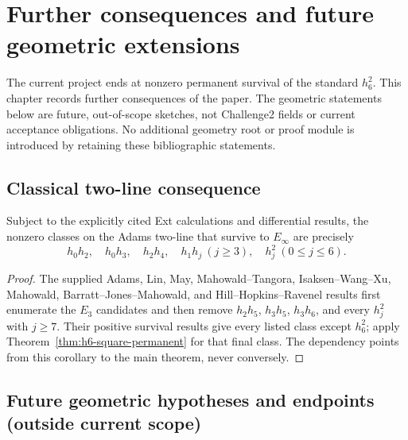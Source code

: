 \chapter{Further consequences and future geometric extensions}
\label{chap:final-kervaire}

The current project ends at nonzero permanent survival of the standard
$h_6^2$. This chapter records further consequences of the paper. The geometric
statements below are future, out-of-scope sketches, not Challenge2 fields or
current acceptance obligations. No additional geometry root or proof module is
introduced by retaining these bibliographic statements.

\section{Classical two-line consequence}

\begin{corollary}
  \label{cor:adams-two-line-survivors}
  \notready
  Subject to the explicitly cited Ext calculations and differential results,
  the nonzero classes on the Adams two-line that survive to $E_\infty$ are
  precisely
  \[
    h_0h_2,\quad h_0h_3,\quad h_2h_4,\quad
    h_1h_j\ (j\ge3),\quad h_j^2\ (0\le j\le6).
  \]
\end{corollary}

\begin{proof}
  The supplied Adams, Lin, May, Mahowald--Tangora, Isaksen--Wang--Xu,
  Mahowald, Barratt--Jones--Mahowald, and Hill--Hopkins--Ravenel results first
  enumerate the $E_3$ candidates and then remove $h_2h_5$, $h_3h_5$,
  $h_3h_6$, and every $h_j^2$ with $j\ge7$.  Their positive survival results
  give every listed class except $h_6^2$; apply
  Theorem~\ref{thm:h6-square-permanent} for that final class.  The dependency
  points from this corollary to the main theorem, never conversely.
\end{proof}

\section{Future geometric hypotheses and endpoints (outside current scope)}

